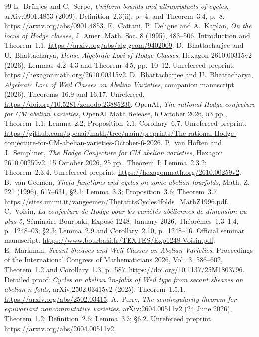 \documentclass[11pt]{article}
\theoremstyle{definition}
\theoremstyle{remark}
\begin{document}
\begin{thebibliography}{99}
 L.~Br\"unjes and C.~Serp\'e, \emph{Uniform bounds and ultraproducts of cycles}, arXiv:0901.4853 (2009), Definition~2.3(ii), p.~4, and Theorem~3.4, p.~8. \url{https://arxiv.org/abs/0901.4853}.
 E.~Cattani, P.~Deligne and A.~Kaplan, \emph{On the locus of Hodge classes}, J. Amer. Math. Soc. 8 (1995), 483--506, Introduction and Theorem~1.1. \url{https://arxiv.org/abs/alg-geom/9402009}.
 D.~Bhattacharjee and U.~Bhattacharya, \emph{Dense Algebraic Loci of Hodge Classes}, Hexagon 2610.00315v2 (2026), Lemmas~4.2--4.3 and Theorem~4.5, pp.~10--12. Unrefereed preprint. \url{https://hexagonmath.org/2610.00315v2}.
 D.~Bhattacharjee and U.~Bhattacharya, \emph{Algebraic Loci of Weil Classes on Abelian Varieties}, companion manuscript (2026), Theorems~16.9 and 16.17. Unrefereed. \url{https://doi.org/10.5281/zenodo.23885230}.
 OpenAI, \emph{The rational Hodge conjecture for CM abelian varieties}, OpenAI Math Release, 6 October 2026, 53 pp., Theorem~1.1; Lemma~2.2; Proposition~3.1; Corollary~6.7. Unrefereed preprint. \url{https://github.com/openai/math/tree/main/preprints/The-rational-Hodge-conjecture-for-CM-abelian-varieties-October-6-2026}.
 P.~van Hoften and J.~Sempliner, \emph{The Hodge Conjecture for CM abelian varieties}, Hexagon 2610.00259v2, 15 October 2026, 25 pp., Theorem~I; Lemma~2.3.2; Theorem~2.3.4. Unrefereed preprint. \url{https://hexagonmath.org/2610.00259v2}.
 B.~van Geemen, \emph{Theta functions and cycles on some abelian fourfolds}, Math. Z. 221 (1996), 617--631, \S2.1; Lemma~3.3; Proposition~3.6; Theorem~3.7. \url{https://sites.unimi.it/vangeemen/ThetafctsCycles4folds_MathZ1996.pdf}.
 C.~Voisin, \emph{La conjecture de Hodge pour les vari\'et\'es ab\'eliennes de dimension au plus 5}, S\'eminaire Bourbaki, Expos\'e 1248, January 2026, Th\'eor\`emes~1.3--1.4, p.~1248--03; \S2.3; Lemma~2.9 and Corollary~2.10, p.~1248--16. Official seminar manuscript. \url{https://www.bourbaki.fr/TEXTES/Exp1248-Voisin.pdf}.
 E.~Markman, \emph{Secant Sheaves and Weil Classes on Abelian Varieties}, Proceedings of the International Congress of Mathematicians 2026, Vol.~3, 586--602, Theorem~1.2 and Corollary~1.3, p.~587. \url{https://doi.org/10.1137/25M1803796}. Detailed proof: \emph{Cycles on abelian $2n$-folds of Weil type from secant sheaves on abelian $n$-folds}, arXiv:2502.03415v2 (2025), Theorem~1.5.1. \url{https://arxiv.org/abs/2502.03415}.
 A.~Perry, \emph{The semiregularity theorem for equivariant noncommutative varieties}, arXiv:2604.00511v2 (24 June 2026), Theorem~1.2; Definition~2.6; Lemma~3.3; \S6.2. Unrefereed preprint. \url{https://arxiv.org/abs/2604.00511v2}.

\end{thebibliography}
\end{document}
